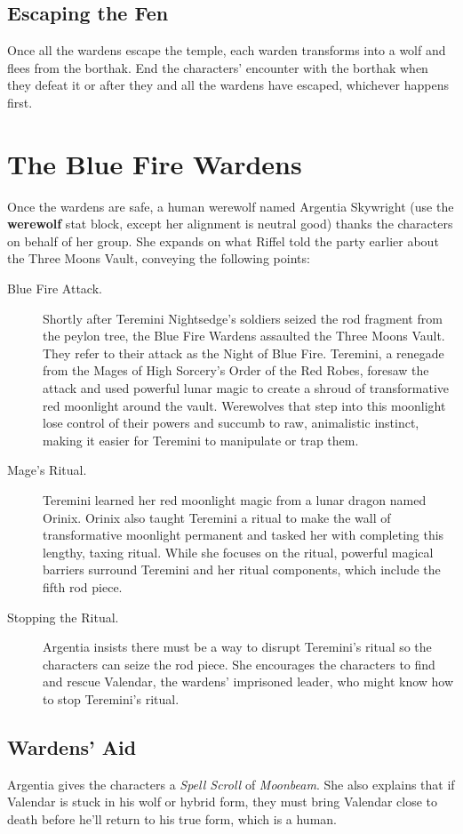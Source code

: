 \documentclass[10pt,a4paper,twoside,bg=print,twocolumn,openany,nodeprecatedcode]{dndbook}
\begin{document}
\subsection{Escaping the Fen}
Once all the wardens escape the temple, each warden transforms into a wolf and flees from the borthak. End the characters' encounter with the borthak when they defeat it or after they and all the wardens have escaped, whichever happens first.

\section{The Blue Fire Wardens}
Once the wardens are safe, a human werewolf named Argentia Skywright (use the \textbf{werewolf} stat block, except her alignment is neutral good) thanks the characters on behalf of her group. She expands on what Riffel told the party earlier about the Three Moons Vault, conveying the following points:


\begin{description}
\item[Blue Fire Attack.]
Shortly after Teremini Nightsedge's soldiers seized the rod fragment from the peylon tree, the Blue Fire Wardens assaulted the Three Moons Vault. They refer to their attack as the Night of Blue Fire. Teremini, a renegade from the Mages of High Sorcery's Order of the Red Robes, foresaw the attack and used powerful lunar magic to create a shroud of transformative red moonlight around the vault. Werewolves that step into this moonlight lose control of their powers and succumb to raw, animalistic instinct, making it easier for Teremini to manipulate or trap them.
\item[Mage's Ritual.]
Teremini learned her red moonlight magic from a lunar dragon named Orinix. Orinix also taught Teremini a ritual to make the wall of transformative moonlight permanent and tasked her with completing this lengthy, taxing ritual. While she focuses on the ritual, powerful magical barriers surround Teremini and her ritual components, which include the fifth rod piece.
\item[Stopping the Ritual.]
Argentia insists there must be a way to disrupt Teremini's ritual so the characters can seize the rod piece. She encourages the characters to find and rescue Valendar, the wardens' imprisoned leader, who might know how to stop Teremini's ritual.
\end{description}

\subsection{Wardens' Aid}
Argentia gives the characters a \textit{Spell Scroll} of \textit{Moonbeam}. She also explains that if Valendar is stuck in his wolf or hybrid form, they must bring Valendar close to death before he'll return to his true form, which is a human.
\end{document}
